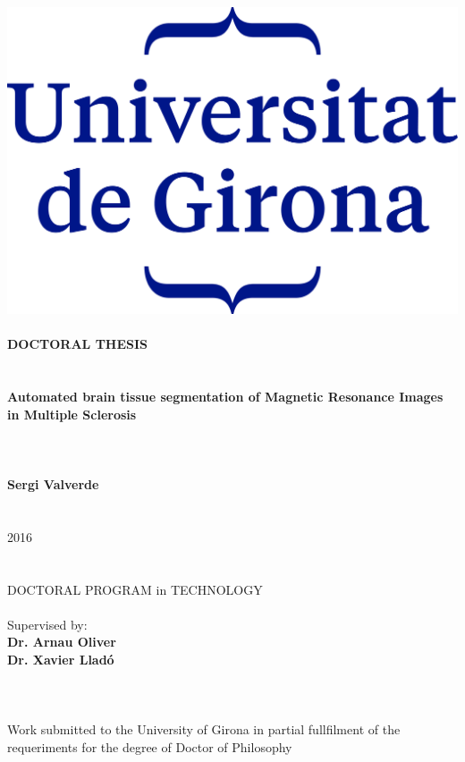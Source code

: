 \hspace{-1.25cm}
\parbox[c]{15cm}{  
  \centering
    \includegraphics[scale = 1]{./figures/logo-udg.png}
    \quad \\
    \quad \\
    \large \textbf{DOCTORAL THESIS}\\
    \quad \\ ~\\
    {
      \LARGE \textbf{Automated brain tissue segmentation of Magnetic Resonance Images in Multiple Sclerosis }
    }\\~\\
    \quad \\
    \quad \\
    \textbf{Sergi Valverde}\\
    \quad \\
    \quad \\
    2016\\
    \quad \\
    \quad \\
    DOCTORAL PROGRAM in TECHNOLOGY\\
    \quad \\
    Supervised by:\\
    \textbf{ Dr. Arnau Oliver}\\
    \textbf{ Dr. Xavier Llad\'{o}}\\
    \quad \\
    \quad \\~\\
    Work submitted to the University of Girona in partial fullfilment of the requeriments for the degree of Doctor of Philosophy
    \quad \\
    \quad \\
  
}




